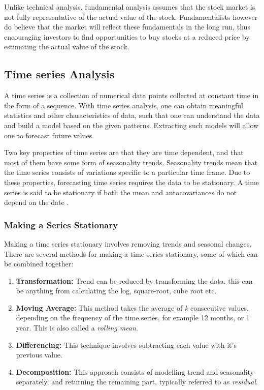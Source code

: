 \documentclass{UoYCSproject}
\begin{document}
Unlike technical analysis, fundamental analysis assumes that the stock market is not fully representative of the actual value of the stock. Fundamentalists however do believe that the market will reflect these fundamentals in the long run, thus encouraging investors to find opportunities to buy stocks at a reduced price by estimating the actual value of the stock. 

\subsection{Time series Analysis}
A time series is a collection of numerical data points collected at constant time in the form of a sequence. With time series analysis, one can obtain meaningful statistics and other characteristics of data, such that one can understand the data and build a model based on the given patterns. Extracting such models will allow one to forecast future values. 

Two key properties of time series are that they are time dependent, and that most of them have some form of seasonality trends. Seasonality trends mean that the time series consists of variations specific to a particular time frame. Due to these properties, forecasting time series requires the data to be stationary. A time series is said to be stationary if both the mean and autocovariances do not depend on the date \cite{hamilton1994time}. 

\subsubsection{Making a Series Stationary}
\label{subsec:stationary}
Making a time series stationary involves removing trends and seasonal changes. There are several methods for making a time series stationary, some of which can be combined together:
\begin{enumerate}
    \item \textbf{Transformation:} Trend can be reduced by transforming the data. this can be anything from calculating the log, square-root, cube root etc.  
    \item \textbf{Moving Average:} This method takes the average of \textit{k} consecutive values, depending on the frequency of the time series, for example 12 months, or 1 year. This is also called a \textit{rolling mean}. 
    \item \textbf{Differencing:} This technique involves subtracting each value with it's previous value.
    \item \textbf{Decomposition:} This approach consists of modelling trend and seasonality separately, and returning the remaining part, typically referred to as \textit{residual}. 
\end{enumerate}
\end{document}

